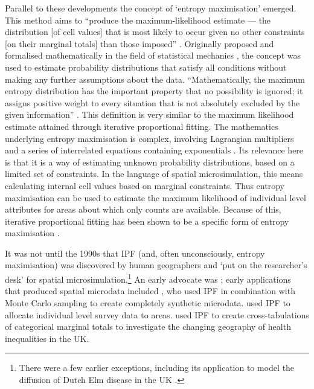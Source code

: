 \documentclass[a4paper, 11pt, twoside]{Thesis}
\begin{document}
Parallel to these developments the concept of `entropy maximisation' emerged.
This method aims to ``produce the maximum-likelihood estimate --- the distribution [of cell
values] that is most likely to occur given no other constraints [on their
marginal totals] than those imposed'' \citep[p.~95]{johnston1985geography}.
Originally proposed and formalised mathematically in the field of statistical
mechanics \citep{jaynes1957information}, the concept was used to estimate
probability distributions that satisfy all conditions without making any
further assumptions about the data. ``Mathematically, the maximum entropy
distribution has the important property that no possibility is ignored; it
assigns positive weight to every situation that is not absolutely excluded by
the given information'' \citep[p.~623]{jaynes1957information}.
This definition is very similar to the maximum likelihood estimate attained
through iterative proportional fitting. The mathematics underlying entropy maximisation
is complex,
involving Lagrangian multipliers and
a series of interrelated equations containing exponentials
\citep{jaynes1957information}. Its relevance here is that it is a way of
estimating unknown probability distributions, based on a limited set of
constraints. In the language of spatial microsimulation, this means calculating
internal cell values based on marginal constraints. Thus entropy maximisation
can be used to estimate the maximum likelihood of individual level attributes
for areas about which only counts are available. Because of this, iterative
proportional fitting has been shown to be a specific form of
entropy maximisation \citep{Beckman1996, ye2009methodology, Rich2012}.

It was not until the
1990s
that IPF (and, often unconsciously, entropy maximisation) was discovered by
human geographers and
`put on the researcher's desk' \citep{Norman1999a} for spatial
microsimulation.\footnote{There
were a few earlier exceptions, including its application to
model the diffusion of Dutch Elm disease in the UK \citep{sarre1978diffusion}.
}
An early advocate was \citet{Wong1992}; early applications that produced
spatial microdata included \citet{Birkin1988}, who used IPF in combination with
Monte Carlo sampling to create completely synthetic microdata.
\citet{Ballas1999} used IPF to allocate individual level survey data to
areas. \citet{Mitchell2002} used IPF to create cross-tabulations
of categorical marginal totals to investigate the changing geography of health
inequalities in the UK.
\end{document}
